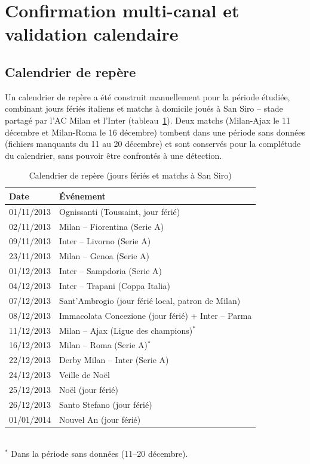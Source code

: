 \section{Confirmation multi-canal et validation calendaire}
\label{sec:multicanal}

\subsection{Calendrier de repère}
\label{sec:calendrier}

Un calendrier de repère a été construit manuellement pour la période
étudiée, combinant jours fériés italiens et matchs à domicile joués à
San Siro -- stade partagé par l'AC Milan et l'Inter
(tableau~\ref{tab:calendrier}). Deux matchs (Milan-Ajax le 11
décembre et Milan-Roma le 16 décembre) tombent dans une période sans
données (fichiers manquants du 11 au 20 décembre) et sont conservés
pour la complétude du calendrier, sans pouvoir être confrontés à une
détection.

\begin{table}[htbp]
  \centering
  \caption{Calendrier de repère (jours fériés et matchs à San Siro)}
  \label{tab:calendrier}
  \small
  \begin{tabular}{ll}
    \toprule
    \textbf{Date} & \textbf{Événement} \\
    \midrule
    01/11/2013 & Ognissanti (Toussaint, jour férié) \\
    02/11/2013 & Milan -- Fiorentina (Serie A) \\
    09/11/2013 & Inter -- Livorno (Serie A) \\
    23/11/2013 & Milan -- Genoa (Serie A) \\
    01/12/2013 & Inter -- Sampdoria (Serie A) \\
    04/12/2013 & Inter -- Trapani (Coppa Italia) \\
    07/12/2013 & Sant'Ambrogio (jour férié local, patron de Milan) \\
    08/12/2013 & Immacolata Concezione (jour férié) + Inter -- Parma \\
    11/12/2013 & Milan -- Ajax (Ligue des champions)$^{*}$ \\
    16/12/2013 & Milan -- Roma (Serie A)$^{*}$ \\
    22/12/2013 & Derby Milan -- Inter (Serie A) \\
    24/12/2013 & Veille de Noël \\
    25/12/2013 & Noël (jour férié) \\
    26/12/2013 & Santo Stefano (jour férié) \\
    01/01/2014 & Nouvel An (jour férié) \\
    \bottomrule
  \end{tabular}
  \\[1mm]
  {\footnotesize $^{*}$ Dans la période sans données (11--20 décembre).}
\end{table}

